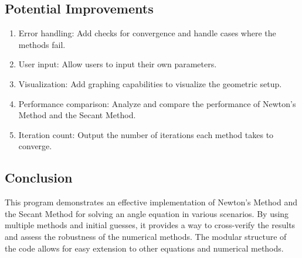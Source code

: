 \documentclass{article}
\begin{document}
\subsection{Potential Improvements}
\begin{enumerate}
\item Error handling: Add checks for convergence and handle cases where the methods fail.
\item User input: Allow users to input their own parameters.
\item Visualization: Add graphing capabilities to visualize the geometric setup.
\item Performance comparison: Analyze and compare the performance of Newton's Method and the Secant Method.
\item Iteration count: Output the number of iterations each method takes to converge.
\end{enumerate}
\subsection{Conclusion}
This program demonstrates an effective implementation of Newton's Method and the Secant Method for solving an angle equation in various scenarios. By using multiple methods and initial guesses, it provides a way to cross-verify the results and assess the robustness of the numerical methods. The modular structure of the code allows for easy extension to other equations and numerical methods.
\end{document}
